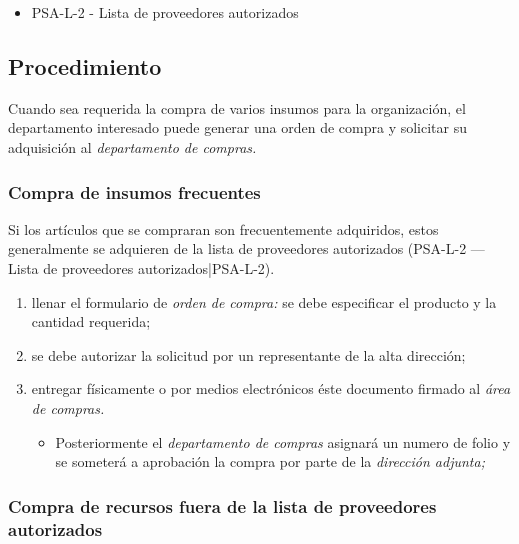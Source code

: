 \begin{itemize}
	\item PSA-L-2 - Lista de proveedores autorizados
\end{itemize}

\subsection{Procedimiento}

Cuando sea requerida la compra de varios insumos para la organización, el departamento interesado puede generar una orden de compra y solicitar su adquisición al \emph{departamento de compras.}

\subsubsection{Compra de insumos frecuentes}

Si los artículos que se compraran son frecuentemente adquiridos, estos generalmente se adquieren de la lista de proveedores autorizados (PSA-L-2 --- Lista de proveedores autorizados|PSA-L-2).

\begin{enumerate}
	\item llenar el formulario de \emph{orden de compra:} se debe especificar el producto y la cantidad requerida;
	\item se debe autorizar la solicitud por un representante de la alta dirección;
	\item entregar físicamente o por medios electrónicos éste documento firmado al \emph{área de compras.}
	\begin{itemize}
		\item Posteriormente el \emph{departamento de compras} asignará un numero de folio y se someterá a aprobación la compra por parte de la \emph{dirección adjunta;}
	\end{itemize}
\end{enumerate}

\subsubsection{Compra de recursos fuera de la lista de proveedores autorizados}

